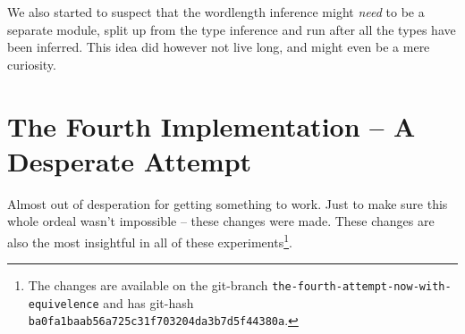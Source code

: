We also started to suspect that the wordlength inference might \textit{need} to be a separate module, split up from the type inference and run after all the types have been inferred. This idea did however not live long, and might even be a mere curiosity.

\section{The Fourth Implementation -- A Desperate Attempt}
\label{sec:Forth}

Almost out of desperation for getting something to work. Just to make sure this whole ordeal wasn't impossible -- these changes were made. These changes are also the most insightful in all of these experiments\cprotect\footnote{The changes are available on the git-branch \verb+the-fourth-attempt-now-with-equivelence+ and has git-hash \verb+ba0fa1baab56a725c31f703204da3b7d5f44380a+.}.

